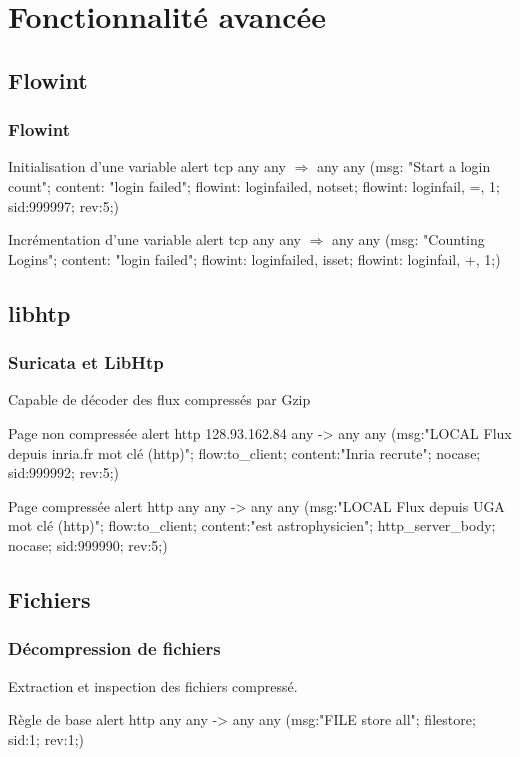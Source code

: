 \documentclass{beamer}
\begin{document}
\section{Fonctionnalité avancée}
\subsection{Flowint}
\begin{frame}
\frametitle{Flowint}
\begin{block}{Initialisation d'une variable}
alert tcp any any $ \Rightarrow $ any any (msg: "Start a login count"; content: "login failed"; flowint: loginfailed, notset; flowint: loginfail, =, 1; sid:999997; rev:5;)
\end{block}
\pause
\begin{block}{Incrémentation d'une variable}
alert tcp any any $ \Rightarrow $ any any (msg: "Counting Logins"; content: "login failed"; flowint: loginfailed, isset; flowint: loginfail, +, 1;)
\end{block}
\end{frame}


\subsection{libhtp}
\begin{frame}
\frametitle{Suricata et LibHtp}
Capable de décoder des flux compressés par Gzip
\begin{block}{Page non compressée}
alert http 128.93.162.84 any -> any any (msg:"LOCAL Flux depuis inria.fr mot clé (http)"; flow:to\_client; content:"Inria recrute"; nocase; sid:999992; rev:5;)
\end{block}
\begin{block}{Page compressée}
alert http any any -> any any (msg:"LOCAL Flux depuis UGA mot clé (http)"; flow:to\_client; content:"est astrophysicien"; http\_server\_body; nocase; sid:999990; rev:5;)
\end{block}
\end{frame}

\subsection{Fichiers}
\begin{frame}
\frametitle{Décompression de fichiers}
Extraction et inspection des fichiers compressé.
\begin{block}{Règle de base}
alert http any any -> any any (msg:"FILE store all"; filestore; sid:1; rev:1;)
\end{block}
\end{frame}
\end{document}
